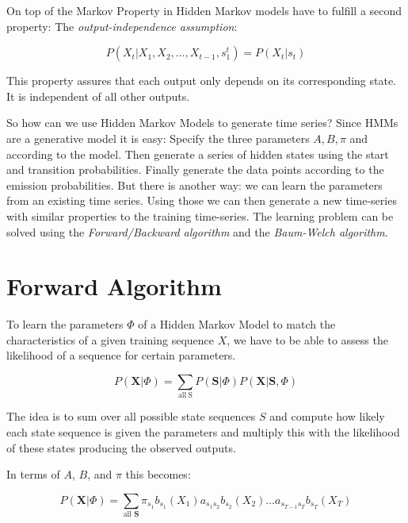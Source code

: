 On top of the Markov Property in Hidden Markov models have to fulfill a second property: The \emph{output-independence assumption}:

\begin{equation}
P\left(X_{t} |X_{1}, X_{2}, \ldots, X_{t-1}, s_{1}^{t}\right)=P\left(X_{t} | s_{t}\right)
\end{equation}

This property assures that each output only depends on its corresponding state. It is independent of all other outputs. 

So how can we use Hidden Markov Models to generate time series? Since HMMs are a generative model it is easy: Specify the three parameters $A, B, \pi$ and according to the model. Then generate a series of hidden states using the start and transition probabilities. Finally generate the data points according to the emission probabilities. But there is another way: we can learn the parameters from an existing time series. Using those we can then generate a new time-series with similar properties to the training time-series. The learning problem can be solved using the \emph{Forward/Backward algorithm} and the \emph{Baum-Welch algorithm}.

\section{Forward Algorithm}

To learn the parameters $\Phi$ of a Hidden Markov Model to match the characteristics of a given training sequence $X$, we have to be able to assess the likelihood of a sequence for certain parameters. 

\begin{equation}
   P(\mathbf{X} | \Phi)=\sum_{\mathrm{all\:S}} P(\mathbf{S} | \Phi) P(\mathbf{X} | \mathbf{S}, \Phi) 
\end{equation}

The idea is to sum over all possible state sequences $S$ and compute how likely each state sequence is given the parameters and multiply this with the likelihood of these states producing the observed outputs. 

In terms of $A$, $B$, and $\pi$ this becomes:

\begin{equation}
   P(\mathbf{X} | \Phi)=\sum_{\text {all } \mathbf{S}} \pi_{s_{1}} b_{s_{1}}\left(X_{1}\right) a_{s_{1} s_{2}} b_{s_{2}}\left(X_{2}\right) \ldots a_{s_{T-1} s_{T}} b_{s_{T}}\left(X_{T}\right) 
\end{equation}

